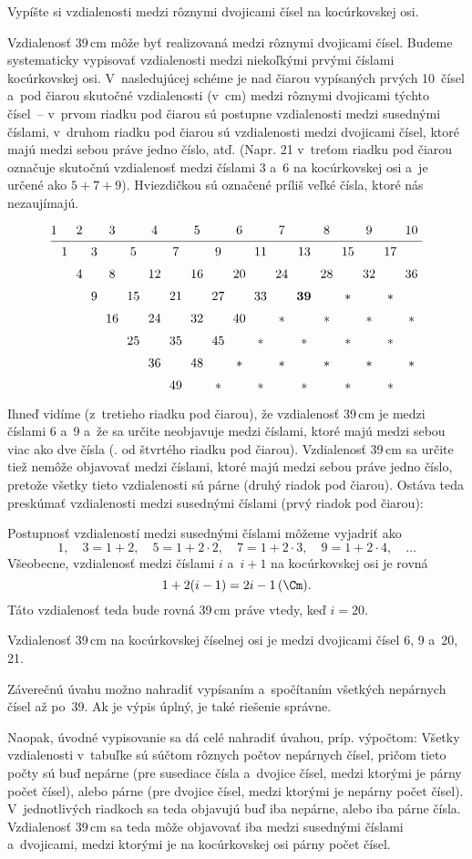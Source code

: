 {%
\napad
Vypíšte si vzdialenosti medzi rôznymi dvojicami čísel na kocúrkovskej osi.

\riesenie
Vzdialenosť 39\,cm môže byť realizovaná medzi rôznymi dvojicami čísel.
Budeme systematicky vypisovať vzdialenosti medzi niekoľkými prvými číslami
kocúrkovskej osi.
V~nasledujúcej schéme je nad čiarou vypísaných prvých 10~čísel a~pod čiarou
skutočné vzdialenosti (v~cm) medzi rôznymi dvojicami týchto čísel~--
v~prvom riadku pod čiarou sú postupne vzdialenosti medzi susednými číslami,
v~druhom riadku pod čiarou sú vzdialenosti medzi dvojicami čísel, ktoré majú medzi sebou práve jedno číslo, atď.
(Napr. 21 v~treťom riadku pod čiarou označuje skutočnú vzdialenosť medzi číslami 3 a~6
na kocúrkovskej osi a~je určené ako $5+7+9$).
Hviezdičkou sú označené príliš veľké čísla, ktoré nás nezaujímajú.
$$
\vbox{
\def\strut{\vrule width 0pt height1.1em depth.55em\relax}
\halign{#&&\strut\hfil\ #\ \hfil\cr
1&&2&&3&&4&&5&&6&&7&&8&&9&&10\cr
\noalign{\hrule}
&1&&3&&5&&7&&9&&11&&13&&15&&17&\cr
&&4&&8&&12&&16&&20&&24&&28&&32&&36\cr
&&&9&&15&&21&&27&&33&&\bf 39&&$*$&&$*$&\cr
&&&&16&&24&&32&&40&&$*$&&$*$&&$*$&&$*$\cr
&&&&&25&&35&&45&&$*$&&$*$&&$*$&&$*$&\cr
&&&&&&36&&48&&$*$&&$*$&&$*$&&$*$&&$*$\cr
&&&&&&&49&&$*$&&$*$&&$*$&&$*$&&$*$&\cr
}}
$$
Ihneď vidíme (z~tretieho riadku pod čiarou), že vzdialenosť 39\,cm je medzi číslami 6
a~9  a~že sa určite neobjavuje medzi číslami, ktoré majú medzi sebou viac ako dve čísla (\tj. od štvrtého riadku pod čiarou).
Vzdialenosť 39\,cm sa určite tiež nemôže objavovať medzi číslami, ktoré majú medzi sebou práve jedno číslo,
pretože všetky tieto vzdialenosti sú párne (druhý riadok pod čiarou).
Ostáva teda preskúmať vzdialenosti medzi susednými číslami (prvý riadok pod čiarou):

Postupnosť vzdialeností medzi susednými číslami môžeme vyjadriť ako
$$
1,\quad 3=1+2,\quad 5=1+2\cdot2,\quad 7=1+2\cdot3,\quad 9=1+2\cdot4,\quad \dots
$$
Všeobecne, vzdialenosť medzi číslami $i$ a~$i+1$ na kocúrkovskej osi je
rovná
$$
1+2(i-1)=2i-1\,(\Cm).
$$
Táto vzdialenosť teda bude rovná 39\,cm práve vtedy, keď $i=20$.

Vzdialenosť 39\,cm na kocúrkovskej číselnej osi je medzi dvojicami čísel 6, 9
a~20, 21.

\poznamky
Záverečnú úvahu možno nahradiť vypísaním a~spočítaním všetkých nepárnych čísel
až po~39.
Ak je výpis úplný, je také riešenie správne.

\smallskip
Naopak, úvodné vypisovanie sa dá celé nahradiť úvahou, príp. výpočtom:
Všetky vzdialenosti v~tabuľke sú súčtom rôznych počtov nepárnych čísel,
pričom tieto počty sú buď nepárne (pre susediace čísla a~dvojice čísel, medzi
ktorými je párny počet čísel), alebo párne (pre dvojice čísel, medzi ktorými
je nepárny počet čísel). V~jednotlivých riadkoch sa teda objavujú buď
iba nepárne, alebo iba párne čísla. Vzdialenosť 39\,cm sa teda môže
objavovať iba medzi susednými číslami a~dvojicami, medzi ktorými je na
kocúrkovskej osi párny počet čísel.

}
